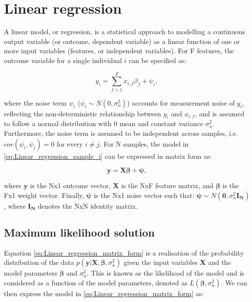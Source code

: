 
\section{Linear regression} 

A linear model, or regression, is a statistical approach to modelling a continuous output variable (or outcome, dependent variable) as a linear function of one or more input variables (features, or independent variables). 
For F features, the outcome variable for a single individual $i$ can be specified as:

\begin{equation} \label{eq:Linear_regression_sample_i}
 y_i = \sum_{f=1}^{F} x_{i,f}\beta_f + \psi_i,
\end{equation}

where the noise term $\psi_i$ ($ \psi_i \sim N(0, \sigma_n^2)$) accounts for measurement noise of $y_i$, reflecting the non-deterministic relationship between $y_i$ and $x_{i,f}$, and is assumed to follow a normal distribution with 0 mean and constant variance $\sigma_n^2$. 
Furthermore, the noise term is assumed to be independent across samples, i.e. $cov(\psi_i, \psi_j)=0$ for every $i \neq j$. 
For N samples, the model in \eqref{eq:Linear_regression_sample_i} can be expressed in matrix form as:

\begin{equation} \label{eq:Linear_regression_matrix_form}
\mathbf{y} = \mathbf{X}\boldsymbol{\beta} + \boldsymbol{\psi}, 
\end{equation}

where $\mathbf{y}$ is the Nx1 outcome vector, $\mathbf{X}$ is the NxF feature matrix, and $\boldsymbol{\beta}$ is the Fx1 weight vector. 
Finally, $\boldsymbol{\psi}$ is the Nx1 noise vector such that: $\boldsymbol{\psi}\sim N(\mathbf{0}, \sigma_n^2 \mathbf{I_N})$, where $\mathbf{I_N}$ denotes the NxN identity matrix. \\ 


\subsection{Maximum likelihood solution}

Equation \eqref{eq:Linear_regression_matrix_form} is a realisation of the probability distribution of the data $p(\mathbf{y}| \mathbf{X}, \boldsymbol{\beta}, \sigma_n^2)$ given the input variables $\mathbf{X}$ and the model parameters $\boldsymbol{\beta}$ and $\sigma_n^2$.
This is known as the likelihood of the model and is considered as a function of the model parameters, denoted as $L(\boldsymbol{\beta}, \sigma_n^2)$. 
We can then express the model in \eqref{eq:Linear_regression_matrix_form} as:

